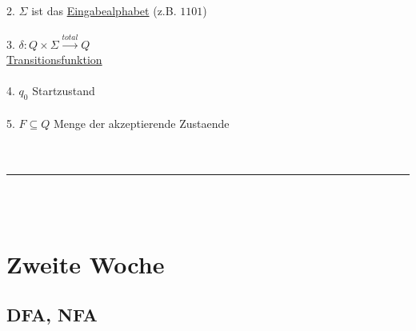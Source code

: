 \documentclass[18pt,a4paper]{scrreprt}
\newcommand{\tab}{\hspace*{2em}}
\begin{document}
\\
2. $\Sigma$ ist das \uline{Eingabealphabet} (z.B. $1101$)\\
\\
3. $\delta : Q \times \Sigma \xrightarrow{total} Q$\\
\tab \uline{Transitionsfunktion}\\
\\
4. $q_0$ Startzustand\\
\\
5. $F \subseteq Q$ Menge der akzeptierende Zustaende\\
\\
\\
\rule{\textwidth}{0.4mm}\\
\\
 
\chapter{Zweite Woche}


\section{DFA, NFA}
\end{document}
